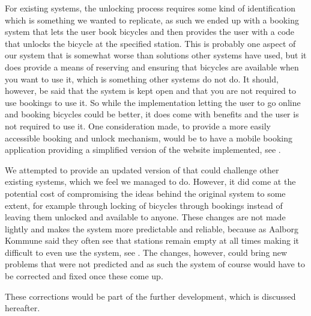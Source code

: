 For existing systems, the unlocking process requires some kind of identification which is something we wanted to replicate, as such we ended up with a booking system that lets the user book bicycles and then provides the user with a code that unlocks the bicycle at the specified station.
This is probably one aspect of our system that is somewhat worse than solutions other systems have used, but it does provide a means of reserving and ensuring that bicycles are available when you want to use it, which is something other systems do not do. 
It should, however, be said that the system is kept open and that you are not required to use bookings to use it.
So while the implementation letting the user to go online and booking bicycles could be better, it does come with benefits and the user is not required to use it.
One consideration made, to provide a more easily accessible booking and unlock mechanism, would be to have a mobile booking application providing a simplified version of the website implemented, see .

We attempted to provide an updated version of \bycykel that could challenge other existing systems, which we feel we managed to do. 
However, it did come at the potential cost of compromising the ideas behind the original system to some extent, for example through locking of bicycles through bookings instead of leaving them unlocked and available to anyone. 
These changes are not made lightly and makes the system more predictable and reliable, because as Aalborg Kommune said they often see that stations remain empty at all times making it difficult to even use the system, see . 
The changes, however, could bring new problems that were not predicted and as such the system of course would have to be corrected and fixed once these come up.

These corrections would be part of the further development, which is discussed hereafter.